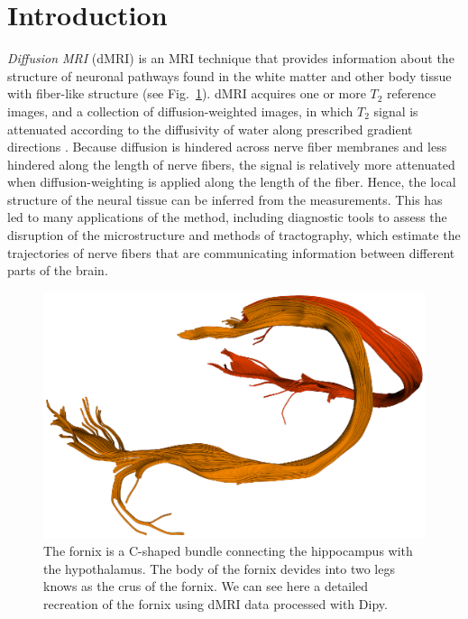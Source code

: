 \documentclass{bioinfo}
\begin{document}
\section{Introduction}

\emph{Diffusion MRI} (dMRI) \citep{merboldt-hanicke-etal:85,
  lebihan-breton:85, taylor-bushell:85}
is an MRI technique \citep{callaghan:91} that provides information
about the structure of neuronal pathways found in the white matter and
other body tissue with fiber-like structure (see Fig.~\ref{Fig:fornix}). dMRI acquires one or more
$T_{2}$ reference images, and a collection of diffusion-weighted images, in which $T_{2}$ signal is attenuated according
to the diffusivity of water along prescribed gradient directions
\citep{behrens-johansen-berg:09, jones:10}. Because diffusion is hindered
across nerve fiber membranes and less hindered along the length of nerve fibers, the
signal is relatively more attenuated when diffusion-weighting is applied along
the length of the fiber. Hence, the local structure of the neural tissue can be
inferred from the measurements. This has led to many applications of the method,
including diagnostic tools to assess the disruption of the microstructure and
methods of tractography, which estimate the trajectories of nerve fibers that
are communicating information between different parts of the brain.

\begin{figure}
\includegraphics[scale=0.55]{Figures/fornix.eps}
\centering{}
\caption{The fornix is a C-shaped bundle connecting the hippocampus with the hypothalamus. The body of the fornix devides into two legs knows as the crus of the fornix. We can see here a detailed recreation of the fornix using dMRI data processed with Dipy. \label{Fig:fornix}}
\end{figure}
\end{document}
